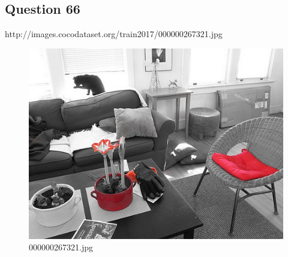 \subsection*{Question 66}
http://images.cocodataset.org/train2017/000000267321.jpg
\begin{figure}[h]
    \centering
    \includegraphics[width=0.8\linewidth]{../image set/hard/000000267321.jpg}
    \caption{000000267321.jpg}
\end{figure}
